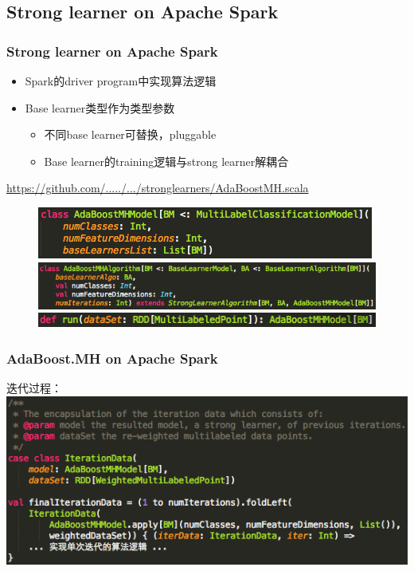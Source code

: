 \documentclass{beamer}
\begin{document}
\subsection{Strong learner on Apache Spark}

\begin{frame}
\frametitle{Strong learner on Apache Spark}
\begin{itemize}
\item Spark的driver program中实现算法逻辑
\item Base learner类型作为类型参数
  \begin{itemize}
    \item 不同base learner可替换，pluggable
    \item Base learner的training逻辑与strong learner解耦合
  \end{itemize}
\end{itemize}
{ \small
\href{https://github.com/BaiGang/spark_multiboost/blob/master/src/main/scala/org/apache/spark/mllib/classification/multilabel/stronglearners/AdaBoostMH.scala}{https://github.com/...../.../stronglearners/AdaBoostMH.scala}
}
\begin{figure}
\includegraphics[scale=0.5,left]{img/adbm_model_spark.png} \\
\includegraphics[scale=0.5,left]{img/adbm_algo_spark.png} \\
\includegraphics[scale=0.5,left]{img/adbm_run.png}
\end{figure}
\end{frame}

\begin{frame}
\frametitle{AdaBoost.MH on Apache Spark}
迭代过程：
\includegraphics[scale=0.5,left]{img/iteration.png}
\end{frame}
\end{document}
